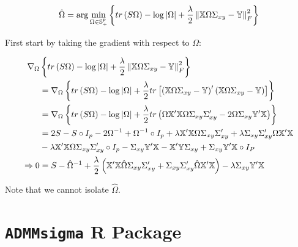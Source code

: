 \documentclass[11pt,]{report}
\theoremstyle{definition}
\theoremstyle{definition}
\theoremstyle{definition}
\theoremstyle{remark}
\begin{document}
\begin{equation}
\hat{\Omega} = \arg\min_{\Omega \in \mathbb{S}_{+}^{p}}\left\{ tr\left(S\Omega\right) - \log\left|\Omega\right| + \frac{\lambda}{2}\left\|\mathbb{X}\Omega\Sigma_{xy} - \mathbb{Y}\right\|_{F}^{2} \right\}
\label{eq:penregression2}\notag
\end{equation}

First start by taking the gradient with respect to \(\Omega\):

\begin{equation}
\begin{split}
  \nabla_{\Omega}&\left\{ tr\left(S\Omega\right) - \log\left|\Omega\right| + \frac{\lambda}{2}\left\|\mathbb{X}\Omega\Sigma_{xy} - \mathbb{Y}\right\|_{F}^{2} \right\} \\
  &= \nabla_{\Omega}\left\{ tr\left(S\Omega\right) - \log\left|\Omega\right| + \frac{\lambda}{2}tr\left[\left(\mathbb{X}\Omega\Sigma_{xy} - \mathbb{Y}\right)'\left(\mathbb{X}\Omega\Sigma_{xy} - \mathbb{Y}\right) \right] \right\} \\
  &= \nabla_{\Omega}\left\{ tr\left(S\Omega\right) - \log\left|\Omega\right| + \frac{\lambda}{2}tr\left(\Omega\mathbb{X}'\mathbb{X}\Omega\Sigma_{xy}\Sigma_{xy}' - 2\Omega\Sigma_{xy}\mathbb{Y}'\mathbb{X} \right) \right\} \\
  &= 2S - S\circ I_{p} - 2\Omega^{-1} + \Omega^{-1}\circ I_{p} + \lambda\mathbb{X}'\mathbb{X}\Omega\Sigma_{xy}\Sigma_{xy}' + \lambda\Sigma_{xy}\Sigma_{xy}'\Omega\mathbb{X}'\mathbb{X} \\
  &- \lambda\mathbb{X}'\mathbb{X}\Omega\Sigma_{xy}\Sigma_{xy}'\circ I_{p} - \Sigma_{xy}\mathbb{Y}'\mathbb{X} - \mathbb{X}'\mathbb{Y}\Sigma_{xy} + \Sigma_{xy}\mathbb{Y}'\mathbb{X}\circ I_{P} \\
  \Rightarrow 0 &= S - \hat{\Omega}^{-1} + \frac{\lambda}{2}\left(\mathbb{X}'\mathbb{X}\hat{\Omega}\Sigma_{xy}\Sigma_{xy}' + \Sigma_{xy}\Sigma_{xy}'\hat{\Omega}\mathbb{X}'\mathbb{X} \right) - \lambda\Sigma_{xy}\mathbb{Y}'\mathbb{X}
\label{eq:penregressionproof}\notag
\end{split}
\end{equation}

Note that we cannot isolate \(\hat{\Omega}\).

\hypertarget{admmsigma-r-package}{%
\chapter{\texorpdfstring{\texttt{ADMMsigma} R Package}{ADMMsigma R Package}}\label{admmsigma-r-package}}
\end{document}
